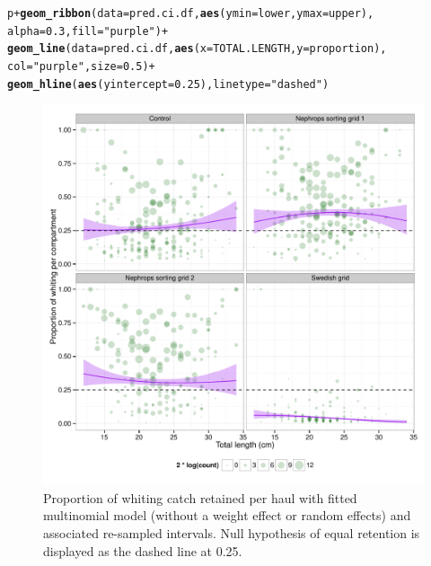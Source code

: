 \documentclass[12pt]{article}\usepackage[]{graphicx}\usepackage[]{color}
\makeatletter
\def\maxwidth{ %
  \ifdim\Gin@nat@width>\linewidth
    \linewidth
  \else
    \Gin@nat@width
  \fi
}
\newcommand{\hlnum}[1]{\textcolor[rgb]{0.686,0.059,0.569}{#1}}%
\newcommand{\hlstr}[1]{\textcolor[rgb]{0.192,0.494,0.8}{#1}}%
\newcommand{\hlopt}[1]{\textcolor[rgb]{0,0,0}{#1}}%
\newcommand{\hlstd}[1]{\textcolor[rgb]{0.345,0.345,0.345}{#1}}%
\newcommand{\hlkwc}[1]{\textcolor[rgb]{0.333,0.667,0.333}{#1}}%
\newcommand{\hlkwd}[1]{\textcolor[rgb]{0.737,0.353,0.396}{\textbf{#1}}}%
\newenvironment{kframe}{%
 \def\at@end@of@kframe{}%
 \ifinner\ifhmode%
  \def\at@end@of@kframe{\end{minipage}}%
  \begin{minipage}{\columnwidth}%
 \fi\fi%
 \def\FrameCommand##1{\hskip\@totalleftmargin \hskip-\fboxsep
 \colorbox{shadecolor}{##1}\hskip-\fboxsep
     \hskip-\linewidth \hskip-\@totalleftmargin \hskip\columnwidth}%
 \MakeFramed {\advance\hsize-\width
   \@totalleftmargin\z@ \linewidth\hsize
   \@setminipage}}%
 {\par\unskip\endMakeFramed%
 \at@end@of@kframe}
\newenvironment{knitrout}{}{} %
\makeatother
\begin{document}
\begin{knitrout}\footnotesize
{}\color{fgcolor}\begin{kframe}
\begin{alltt}
\hlstd{p} \hlopt{+} \hlkwd{geom_ribbon}\hlstd{(}\hlkwc{data} \hlstd{= pred.ci.df,} \hlkwd{aes}\hlstd{(}\hlkwc{ymin} \hlstd{= lower,} \hlkwc{ymax} \hlstd{= upper),}
                \hlkwc{alpha} \hlstd{=} \hlnum{0.3}\hlstd{,} \hlkwc{fill} \hlstd{=} \hlstr{"purple"}\hlstd{)} \hlopt{+}
  \hlkwd{geom_line}\hlstd{(}\hlkwc{data} \hlstd{= pred.ci.df,} \hlkwd{aes}\hlstd{(}\hlkwc{x} \hlstd{= TOTAL.LENGTH,} \hlkwc{y} \hlstd{= proportion),}
            \hlkwc{col} \hlstd{=} \hlstr{"purple"}\hlstd{,} \hlkwc{size} \hlstd{=} \hlnum{0.5}\hlstd{)} \hlopt{+}
  \hlkwd{geom_hline}\hlstd{(}\hlkwd{aes}\hlstd{(}\hlkwc{yintercept} \hlstd{=} \hlnum{0.25}\hlstd{),} \hlkwc{linetype} \hlstd{=} \hlstr{"dashed"}\hlstd{)}
\end{alltt}
\end{kframe}\begin{figure}
\includegraphics[width=\maxwidth]{figure/unnamed-chunk-8-1} \caption[Proportion of whiting catch retained per haul with fitted multinomial model (without a weight effect or random effects) and associated re-sampled intervals]{Proportion of whiting catch retained per haul with fitted multinomial model (without a weight effect or random effects) and associated re-sampled intervals. Null hypothesis of equal retention is displayed as the dashed line at 0.25.}\label{fig:unnamed-chunk-8}
\end{figure}


\end{knitrout}
\end{document}
